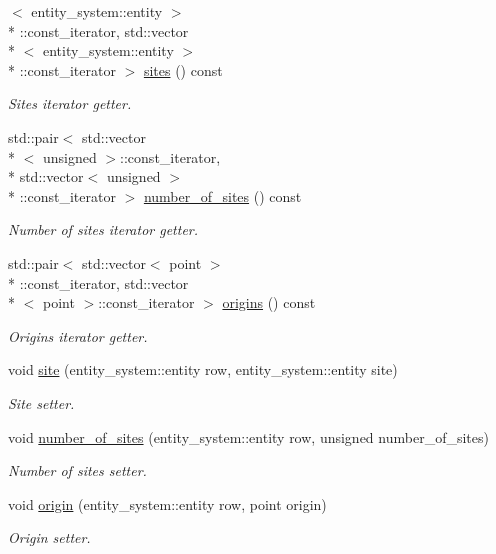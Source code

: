 \begin{DoxyCompactItemize}
$<$ entity\-\_\-system\-::entity $>$\\*
\-::const\-\_\-iterator, std\-::vector\\*
$<$ entity\-\_\-system\-::entity $>$\\*
\-::const\-\_\-iterator $>$ \hyperlink{classophidian_1_1floorplan_1_1rows_a805bd206a9127e594e090916226e6be4}{sites} () const 
\begin{DoxyCompactList}\small\item\em Sites iterator getter. \end{DoxyCompactList}\item 
std\-::pair$<$ std\-::vector\\*
$<$ unsigned $>$\-::const\-\_\-iterator, \\*
std\-::vector$<$ unsigned $>$\\*
\-::const\-\_\-iterator $>$ \hyperlink{classophidian_1_1floorplan_1_1rows_ad9da40317e6b4eaada1893b925bca1f4}{number\-\_\-of\-\_\-sites} () const 
\begin{DoxyCompactList}\small\item\em Number of sites iterator getter. \end{DoxyCompactList}\item 
std\-::pair$<$ std\-::vector$<$ point $>$\\*
\-::const\-\_\-iterator, std\-::vector\\*
$<$ point $>$\-::const\-\_\-iterator $>$ \hyperlink{classophidian_1_1floorplan_1_1rows_a37a388de47fe14525780086d17e3bcfb}{origins} () const 
\begin{DoxyCompactList}\small\item\em Origins iterator getter. \end{DoxyCompactList}\item 
void \hyperlink{classophidian_1_1floorplan_1_1rows_a3c68634bfe32f3cc85224ea20864329c}{site} (entity\-\_\-system\-::entity row, entity\-\_\-system\-::entity site)
\begin{DoxyCompactList}\small\item\em Site setter. \end{DoxyCompactList}\item 
void \hyperlink{classophidian_1_1floorplan_1_1rows_a03b8a076dc9098867ca7e238e9c7c202}{number\-\_\-of\-\_\-sites} (entity\-\_\-system\-::entity row, unsigned number\-\_\-of\-\_\-sites)
\begin{DoxyCompactList}\small\item\em Number of sites setter. \end{DoxyCompactList}\item 
void \hyperlink{classophidian_1_1floorplan_1_1rows_a12d2bd1b0e077dbaa7510dba2608d660}{origin} (entity\-\_\-system\-::entity row, point origin)
\begin{DoxyCompactList}\small\item\em Origin setter. \end{DoxyCompactList}\end{DoxyCompactItemize}


